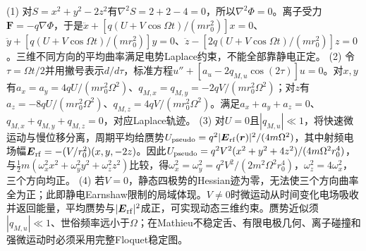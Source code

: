 (1) 对\(S=x^2+y^2-2z^2\)有\(\nabla^2S=2+2-4=0\)，所以\(\nabla^2\Phi=0\)。离子受力\(\boldsymbol F=-q\nabla\Phi\)，于是\(\ddot x+[q(U+V\cos\Omega t)/(mr_0^2)]x=0\)、\(\ddot y+[q(U+V\cos\Omega t)/(mr_0^2)]y=0\)、\(\ddot z-[2q(U+V\cos\Omega t)/(mr_0^2)]z=0\)。三维不同方向的平均曲率满足电势Laplace约束，不能全部靠静电正定。
(2) 令\(\tau=\Omega t/2\)并用撇号表示\(d/d\tau\)，标准方程\(u''+[a_u-2q_{M,u}\cos(2\tau)]u=0\)。对\(x,y\)有\(a_x=a_y=4qU/(mr_0^2\Omega^2)\)、\(q_{M,x}=q_{M,y}=-2qV/(mr_0^2\Omega^2)\)；对\(z\)有\(a_z=-8qU/(mr_0^2\Omega^2)\)、\(q_{M,z}=4qV/(mr_0^2\Omega^2)\)。满足\(a_x+a_y+a_z=0\)、\(q_{M,x}+q_{M,y}+q_{M,z}=0\)，对应Laplace轨迹。
(3) 对\(U=0\)且\(|q_{M,u}|\ll1\)，将快速微运动与慢位移分离，周期平均给赝势\(U_{\rm pseudo}=q^2|\boldsymbol E_{\rm rf}(\boldsymbol r)|^2/(4m\Omega^2)\)，其中射频电场幅\(\boldsymbol E_{\rm rf}=-(V/r_0^2)(x,y,-2z)\)。因此\(U_{\rm pseudo}=q^2V^2(x^2+y^2+4z^2)/(4m\Omega^2r_0^4)\)，与\(\tfrac12m(\omega_x^2x^2+\omega_y^2y^2+\omega_z^2z^2)\)比较，得\(\omega_x^2=\omega_y^2=q^2V^2/(2m^2\Omega^2r_0^4)\)，\(\omega_z^2=4\omega_x^2\)，三个方向均正。
(4) 若\(V=0\)，静态四极势的Hessian迹为零，无法使三个方向曲率全为正；此即静电Earnshaw限制的局域体现。\(V\ne0\)时微运动从时间变化电场吸收并返回能量，平均赝势与\(|\boldsymbol E_{\rm rf}|^2\)成正，可实现动态三维约束。赝势近似须\(|q_{M,u}|\ll1\)、世俗频率远小于\(\Omega\)；在Mathieu不稳定舌、有限电极几何、离子碰撞和强微运动时必须采用完整Floquet稳定图。

